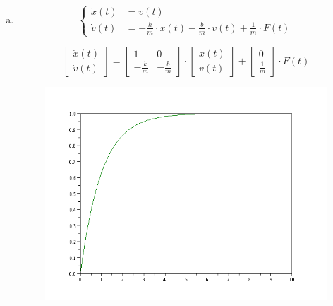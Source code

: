 \documentclass{article}
\begin{document}
\begin{itemize}
\begin{enumerate}[a)]
        \item
\begin{equation}
\left\{ \begin{array}{rl}
  \dot{x}(t) &= v(t) \\
  \dot{v}(t) &= - \frac{k}{m} \cdot x(t) - \frac{b}{m} \cdot v(t) + \frac{1}{m} \cdot F(t)
       \end{array} \right .
 \label{P1.1a} \tag{1.5}
\end{equation}

\begin{equation*}
\begin{bmatrix}
   \dot{x}(t) \\
   \dot{v}(t) 
 \end{bmatrix}
=
\begin{bmatrix}
   1 & 0 \\
  - \frac{k}{m} &  - \frac{b}{m}
\end{bmatrix} 
\cdot 
\begin{bmatrix}
   x(t) \\
   v(t) 
\end{bmatrix}
+
\begin{bmatrix}
   0 \\
\frac{1}{m}
\end{bmatrix}
\cdot
F(t)
\end{equation*}

\begin{figure}[H]
\includegraphics[width=\textwidth]{img/ej03b.png}
\caption{}
\end{figure}




\end{enumerate}
\end{itemize}
\end{document}
